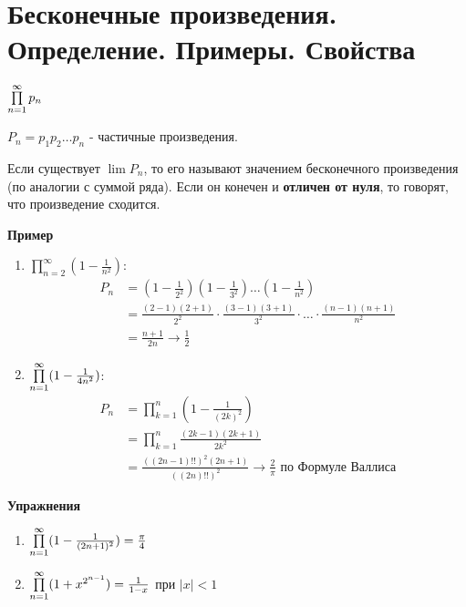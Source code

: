 \section{Бесконечные произведения. Определение. Примеры. Свойства }
\begin{conj}
    $\prod \limits_{n=1}^\infty p_n$

    $P_n = p_1p_2 \ldots p_n$ - частичные произведения.

    Если существует $\lim P_n$, то его называют значением бесконечного произведения (по аналогии с суммой ряда).
    Если он конечен и \textbf{отличен от нуля}, то говорят, что произведение сходится.
\end{conj}

\textbf{Пример}
\begin{enumerate}
    \item $\prod \limits_{n=2}^\infty (1 - \frac{1}{n^2})$:
    \begin{align*}
        P_n &= (1 - \frac{1}{2^2})(1-\frac{1}{3^2})\ldots (1-\frac{1}{n^2}) \\
        &= \frac{(2-1)(2+1)}{2^2}
        \cdot \frac{(3-1)(3+1)}{3^2} 
        \cdot \ldots \cdot \frac{(n-1)(n+1)}{n^2} \\
        &= \frac{n+1}{2n} \longrightarrow \frac{1}{2}
    \end{align*}
    \item $\prod \limits_{n=1}^\infty (1 - \frac{1}{4n^2})$:
    \begin{align*}
        P_n &= \prod \limits_{k=1}^n (1 - \frac{1}{(2k)^2}) \\
        &= \prod \limits_{k=1}^n \frac{(2k-1)(2k+1)}{2k^2} \\
        &= \frac{((2n-1)!!)^2(2n+1)}{((2n)!!)^2} \longrightarrow \frac{2}{\pi} \text{ по Формуле Валлиса}
    \end{align*}
\end{enumerate}
\textbf{Упражнения}
\begin{enumerate}
    \item $\prod \limits_{n=1}^\infty (1 - \frac{1}{(2n+1)^2}) = \frac{\pi}{4}$
    \item $\prod \limits_{n=1}^\infty (1+x^{2^{n-1}}) = \frac{1}{1-x}$ при $|x| < 1$
\end{enumerate}

